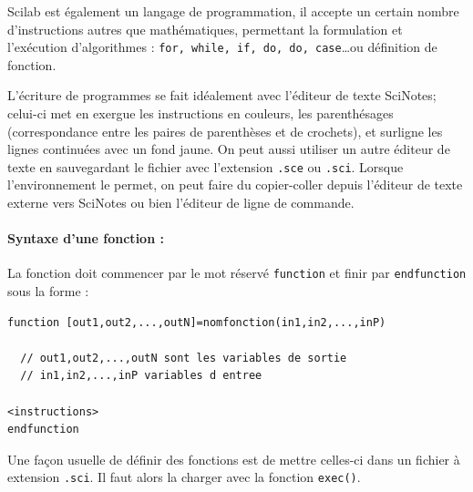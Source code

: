 Scilab est également un langage de programmation, il accepte un certain nombre 
d'instructions autres que mathématiques, permettant la formulation et 
l'exécution d'algorithmes : \verb?for, while, if, do, do, case?\ldots ou 
définition de fonction.

L'écriture de programmes se fait idéalement avec l'éditeur de 
texte SciNotes; celui-ci met en exergue les instructions en couleurs, 
les parenthésages (correspondance entre les paires de parenthèses 
et de crochets), et surligne les lignes continuées avec un fond jaune. 
On peut aussi utiliser un autre éditeur de texte en sauvegardant le fichier 
avec l'extension \verb?.sce? ou \verb?.sci?. Lorsque l'environnement le permet,
on peut faire du copier-coller depuis l'éditeur de texte externe vers SciNotes 
ou bien l'éditeur de ligne de commande.

\paragraph{Syntaxe d'une fonction :}

La fonction doit commencer par le mot réservé \verb?function? et finir par 
\verb?endfunction? sous la forme :
\begin{code}
\begin{verbatim}
function [out1,out2,...,outN]=nomfonction(in1,in2,...,inP)

  // out1,out2,...,outN sont les variables de sortie
  // in1,in2,...,inP variables d entree
          
<instructions>
endfunction
\end{verbatim}
\end{code}

Une façon usuelle de définir des fonctions est de mettre 
celles-ci dans un fichier à extension \verb?.sci?. 
Il faut alors la charger avec la fonction \verb?exec()?.

